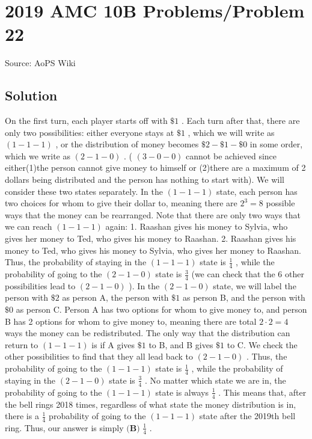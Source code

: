 \documentclass[12pt]{article}
\begin{document}
\section*{{2019 AMC 10B Problems/Problem 22}}
Source: AoPS Wiki

\subsection*{Solution}
On the first turn, each player starts off with $\$1$ . Each turn after that, there are only two possibilities: either everyone stays at $\$1$ , which we will write as $(1-1-1)$ , or the distribution of money becomes $\$2-\$1-\$0$ in some order, which we write as $(2-1-0)$ . ( $(3-0-0)$ cannot be achieved since either(1)the person cannot give money to himself or (2)there are a maximum of 2 dollars being distributed and the person has nothing to start with). We will consider these two states separately. In the $(1-1-1)$ state, each person has two choices for whom to give their dollar to, meaning there are $2^3=8$ possible ways that the money can be rearranged. Note that there are only two ways that we can reach $(1-1-1)$ again: 1. Raashan gives his money to Sylvia, who gives her money to Ted, who gives his money to Raashan. 2. Raashan gives his money to Ted, who gives his money to Sylvia, who gives her money to Raashan. Thus, the probability of staying in the $(1-1-1)$ state is $\frac{1}{4}$ , while the probability of going to the $(2-1-0)$ state is $\frac{3}{4}$ (we can check that the 6 other possibilities lead to $(2-1-0)$ ). In the $(2-1-0)$ state, we will label the person with $\$2$ as person A, the person with $\$1$ as person B, and the person with $\$0$ as person C. Person A has two options for whom to give money to, and person B has 2 options for whom to give money to, meaning there are total $2\cdot 2 = 4$ ways the money can be redistributed. The only way that the distribution can return to $(1-1-1)$ is if A gives $\$1$ to B, and B gives $\$1$ to C. We check the other possibilities to find that they all lead back to $(2-1-0)$ . Thus, the probability of going to the $(1-1-1)$ state is $\frac{1}{4}$ , while the probability of staying in the $(2-1-0)$ state is $\frac{3}{4}$ . No matter which state we are in, the probability of going to the $(1-1-1)$ state is always $\frac{1}{4}$ . This means that, after the bell rings 2018 times, regardless of what state the money distribution is in, there is a $\frac{1}{4}$ probability of going to the $(1-1-1)$ state after the 2019th bell ring. Thus, our answer is simply $\boxed{\textbf{(B) } \frac{1}{4}}$ .
\end{document}
